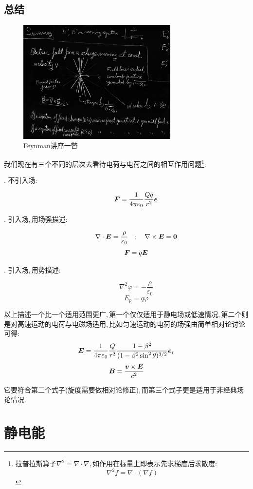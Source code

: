 \subsection{总结}

\begin{figure}
\centering
\vspace{-0.1cm}
\includegraphics[width=8cm]{image/7-1-7.png}
\caption{Feynman讲座一瞥}
\end{figure}
我们现在有三个不同的层次去看待电荷与电荷之间的相互作用问题\footnote{拉普拉斯算子$\nabla^2=\nabla\cdot\nabla$,\,如作用在标量上即表示先求梯度后求散度:
	\[\nabla^2f=\nabla\cdot(\nabla f)\]}:
\begin{description}
	\item[{. 不引入场:}]

	\[\boldsymbol{F}=\frac{1}{4\pi\varepsilon_0}\frac{Qq}{r^2}\boldsymbol{e}\]

	\item[{. 引入场,\,用场强描述:}]

	\[\nabla\cdot \boldsymbol{E}=\frac{\rho}{\varepsilon_0}\quad ;\quad \nabla\times\boldsymbol{E}=\boldsymbol{0}\]
	\[\boldsymbol{F}=q\boldsymbol{E}\]

	\item[{. 引入场,\,用势描述:}]
	\[\nabla^2 \varphi=-\frac{\rho}{\varepsilon_0}\]
	\[E_p=q\varphi\]
\end{description}


以上描述一个比一个适用范围更广,\,第一个仅仅适用于静电场或低速情况,\,第二个则是对高速运动的电荷与电磁场适用,\,比如匀速运动的电荷的场强由简单相对论讨论可得:
\[\boldsymbol{E}=\frac{1}{4\pi\varepsilon_0}\frac{Q}{r^2}\frac{1-\beta^2}{(1-\beta^2\sin^2\theta)^{3/2}}\boldsymbol{e}_r\]
\[\boldsymbol{B}=\frac{\boldsymbol{v}\times\boldsymbol{E}}{c^2}\]

它要符合第二个式子(旋度需要做相对论修正),\,而第三个式子更是适用于非经典场论情况.


\section{静电能}

